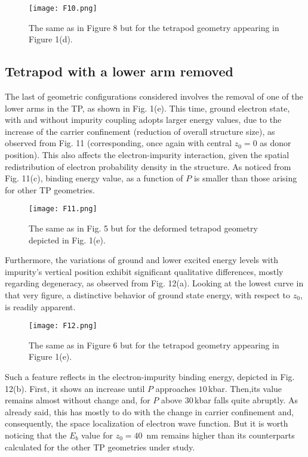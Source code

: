 \documentclass[nanomaterials,article,submit,moreauthors,pdftex]{Definitions/mdpi}
\begin{document}
\begin{figure}[H]
    \centering
    \texttt{[image: F10.png]}
    \caption{The same as in Figure 8 but for the tetrapod geometry appearing in Figure 1(d).}
    \label{F10}
\end{figure}

\subsection{Tetrapod with a lower arm removed}

The last of geometric configurations considered involves the removal of one of the lower arms in the TP, as shown in Fig. 1(e). This time, ground electron state, with and without impurity coupling adopts larger energy values, due to the increase of the carrier confinement (reduction of overall structure size), as observed from Fig. 11 (corresponding, once again with central $z_0=0$ as donor position). This also affects the electron-impurity interaction, given the spatial redistribution of electron probability density in the structure. As noticed from Fig. 11(c), binding energy value, as a function of $P$ is smaller than those arising for other TP geometries. 

\begin{figure}[H]
    \centering	\texttt{[image: F11.png]}
    \caption{The same as in Fig. 5 but for the deformed tetrapod geometry depicted in Fig. 1(e).}
    \label{F11}
\end{figure}

Furthermore, the variations of ground and lower excited energy levels with impurity's vertical position exhibit significant qualitative differences, mostly regarding degeneracy, as observed from Fig. 12(a). Looking at the lowest curve in that very figure, a distinctive behavior of ground state energy, with respect to $z_0$, is readily apparent. 

\begin{figure}[H]
    \centering
    \texttt{[image: F12.png]}
        \caption{The same as in Figure 6 but for the tetrapod geometry appearing in Figure 1(e).}
    \label{F12}
\end{figure}

\noindent Such a feature reflects in the electron-impurity binding energy, depicted in Fig. 12(b). First, it shows an increase until $P$ approaches $10\,$kbar. Then,its value  remains almost without change and, for $P$ above $30\,$kbar falls quite abruptly. As already said, this has mostly to do with the change in carrier confinement and, consequently, the space localization of electron wave function. But it is worth noticing that the $E_b$ value for $z_0=40\,$ nm remains higher than its counterparts calculated for the other TP geometries under study.
\end{document}
